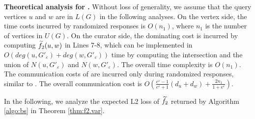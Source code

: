 \noindent
{\bf Theoretical analysis for \bs.} %
{\color{black}
Without loss of generality, we assume that the query vertices $u$ and $w$ are in $L(G)$ in the following analyses. 
On the vertex side, the time costs incurred by randomized responses is $O(n_1)$, where $n_1$ is the number of vertices in $U(G)$. 
On the curator side, the dominating cost is incurred by computing $\widetilde{f}_2(u, w)$ in Lines 7-8, which can be implemented in $O(deg(u, G'_{\varepsilon}) + deg(w, G'_{\varepsilon}))$ time by computing the intersection and the union of $N(u, G'_{\varepsilon})$ and $N(w, G'_{\varepsilon})$. The overall time complexity is $O(n_1)$. 
The communication costs of \bs are incurred only during randomized responses, similar to \naive. The overall communication cost is $O\left(\frac{e^{\varepsilon}-1}{e^{\varepsilon}+1}(d_u + d_w) + \frac{2n_1}{1 + e^{\varepsilon}}\right)$. }

In the following, we analyze the expected L2 loss of $\widetilde{f}_2$ returned by Algorithm \ref{algo:bs} in Theorem \ref{thm:f2.var}. 




